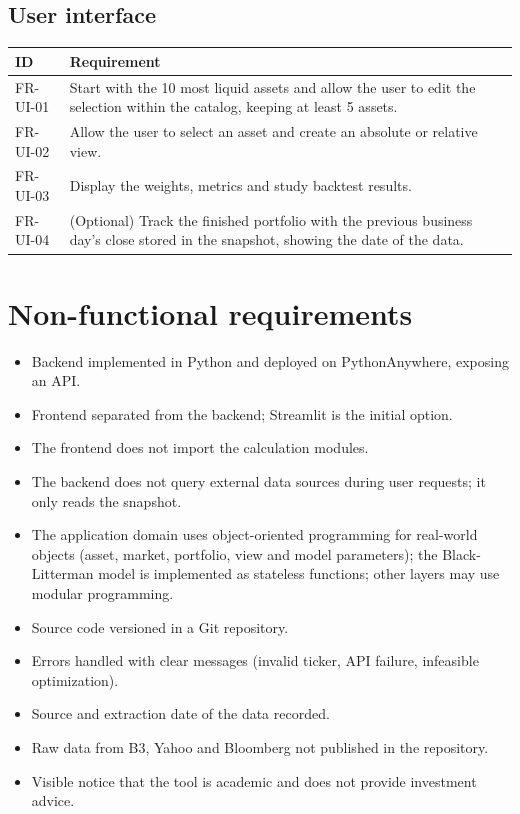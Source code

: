 \subsection{User interface}
\begin{tabularx}{\textwidth}{@{}lX@{}}
\toprule
\textbf{ID} & \textbf{Requirement} \\ \midrule
FR-UI-01 & Start with the 10 most liquid assets and allow the user to edit the selection within the catalog, keeping at least 5 assets. \\
FR-UI-02 & Allow the user to select an asset and create an absolute or relative view. \\
FR-UI-03 & Display the weights, metrics and study backtest results. \\
FR-UI-04 & (Optional) Track the finished portfolio with the previous business day's close stored in the snapshot, showing the date of the data. \\
\bottomrule
\end{tabularx}

\section{Non-functional requirements}
\begin{itemize}
  \item Backend implemented in Python and deployed on PythonAnywhere, exposing an API.
  \item Frontend separated from the backend; Streamlit is the initial option.
  \item The frontend does not import the calculation modules.
  \item The backend does not query external data sources during user requests; it only reads the snapshot.
  \item The application domain uses object-oriented programming for real-world objects (asset, market, portfolio, view and model parameters); the Black-Litterman model is implemented as stateless functions; other layers may use modular programming.
  \item Source code versioned in a Git repository.
  \item Errors handled with clear messages (invalid ticker, API failure, infeasible optimization).
  \item Source and extraction date of the data recorded.
  \item Raw data from B3, Yahoo and Bloomberg not published in the repository.
  \item Visible notice that the tool is academic and does not provide investment advice.
\end{itemize}

